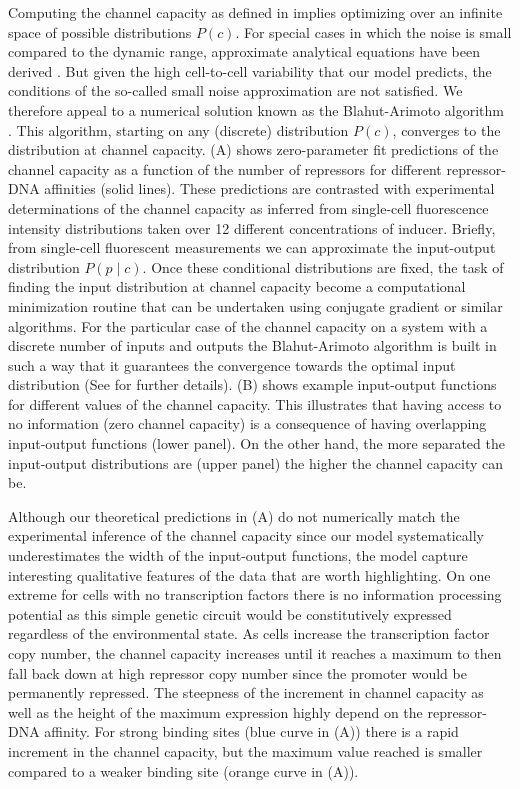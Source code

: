 Computing the channel capacity as defined in  implies
optimizing over an infinite space of possible distributions $P(c)$. For special
cases in which the noise is small compared to the dynamic range, approximate
analytical equations have been derived \cite{Tkacik2008a}. But given the high
cell-to-cell variability that our model predicts, the conditions of the
so-called small noise approximation are not satisfied. We therefore appeal to a
numerical solution known as the Blahut-Arimoto algorithm \cite{Blahut1972}.
This algorithm, starting on any (discrete) distribution $P(c)$, converges to
the distribution at channel capacity. (A) shows
zero-parameter fit predictions of the channel capacity as a function of the
number of repressors for different repressor-DNA affinities (solid lines).
These predictions are contrasted with experimental determinations of the
channel capacity as inferred from single-cell fluorescence intensity
distributions taken over 12 different concentrations of inducer. Briefly, from
single-cell fluorescent measurements we can approximate the input-output
distribution $P(p \mid c)$. Once these conditional distributions are fixed, the
task of finding the input distribution at channel capacity become a
computational minimization routine that can be undertaken using conjugate
gradient or similar algorithms. For the particular case of the channel capacity
on a system with a discrete number of inputs and outputs the Blahut-Arimoto
algorithm is built in such a way that it guarantees the convergence towards the
optimal input distribution (See  for further details).
(B) shows example input-output functions for different
values of the channel capacity. This illustrates that having access to no
information (zero channel capacity) is a consequence of having overlapping
input-output functions (lower panel). On the other hand, the more separated the
input-output distributions are (upper panel) the higher the channel capacity
can be.

Although our theoretical predictions in (A) do not
numerically match the experimental inference of the channel capacity since our
model systematically underestimates the width of the input-output functions,
the model capture interesting qualitative features of the data that are worth
highlighting. On one extreme for cells with no transcription factors there is
no information processing potential as this simple genetic circuit would be
constitutively expressed regardless of the environmental state. As cells
increase the transcription factor copy number, the channel capacity increases
until it reaches a maximum to then fall back down at high repressor copy number
since the promoter would be permanently repressed. The steepness of the
increment in channel capacity as well as the height of the maximum expression
highly depend on the repressor-DNA affinity. For strong binding sites (blue
curve in (A)) there is a rapid increment in the channel
capacity, but the maximum value reached is smaller compared to a weaker binding
site (orange curve in (A)). 

